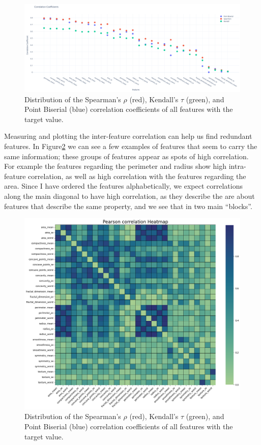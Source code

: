 \documentclass[12pt]{article}
\begin{document}
\begin{figure}[H]
    \centering
    \includegraphics[width=\textwidth]{ims/corr_coeffs.png}
    \caption{Distribution of the Spearman's $\rho$ (red), Kendall's $\tau$
    (green), and Point Biserial (blue) correlation coefficients of all features
    with the target value.}
    \label{fig:corr_coeffs}
\end{figure}

Measuring and plotting the inter-feature correlation can help us find redundant
features. In Figure\ref{fig:corr_coeffs_heatmap} we can see a few examples of
features that seem to carry the same information; these groups of features
appear as spots of high correlation. For example the features regarding the
perimeter and radius show high intra-feature correlation, as well as high
correlation with the features regarding the area. Since I have ordered the
features alphabetically, we expect correlations along the main diagonal to
have high correlation, as they describe the are about features that describe the
same property, and we see that in two main ``blocks''.

\begin{figure}[H]
    \centering
    \includegraphics[width=\textwidth]{ims/corr_coeffs_heatmap.png}
    \caption{Distribution of the Spearman's $\rho$ (red), Kendall's $\tau$
    (green), and Point Biserial (blue) correlation coefficients of all features
    with the target value.}
    \label{fig:corr_coeffs_heatmap}
\end{figure}
\end{document}
